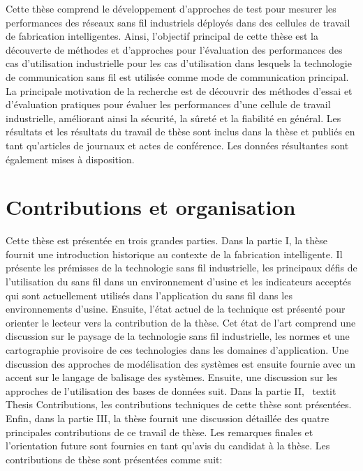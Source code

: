 \documentclass[12pt]{article}
\begin{document}
		Cette thèse comprend le développement d'approches de test pour mesurer les performances des réseaux sans fil industriels déployés dans des cellules de travail de fabrication intelligentes. Ainsi, l'objectif principal de cette thèse est la découverte de méthodes et d'approches pour l'évaluation des performances des cas d'utilisation industrielle pour les cas d'utilisation dans lesquels la technologie de communication sans fil est utilisée comme mode de communication principal. La principale motivation de la recherche est de découvrir des méthodes d'essai et d'évaluation pratiques pour évaluer les performances d'une cellule de travail industrielle, améliorant ainsi la sécurité, la sûreté et la fiabilité en général. Les résultats et les résultats du travail de thèse sont inclus dans la thèse et publiés en tant qu'articles de journaux et actes de conférence. Les données résultantes sont également mises à disposition.
		
		\section*{Contributions et organisation}
		
		Cette thèse est présentée en trois grandes parties. Dans la partie I, la thèse fournit une introduction historique au contexte de la fabrication intelligente. Il présente les prémisses de la technologie sans fil industrielle, les principaux défis de l'utilisation du sans fil dans un environnement d'usine et les indicateurs acceptés qui sont actuellement utilisés dans l'application du sans fil dans les environnements d'usine. Ensuite, l'état actuel de la technique est présenté pour orienter le lecteur vers la contribution de la thèse. Cet état de l'art comprend une discussion sur le paysage de la technologie sans fil industrielle, les normes et une cartographie provisoire de ces technologies dans les domaines d'application. Une discussion des approches de modélisation des systèmes est ensuite fournie avec un accent sur le langage de balisage des systèmes. Ensuite, une discussion sur les approches de l'utilisation des bases de données suit. Dans la partie II, \ textit {Thesis Contributions}, les contributions techniques de cette thèse sont présentées. Enfin, dans la partie III, la thèse fournit une discussion détaillée des quatre principales contributions de ce travail de thèse. Les remarques finales et l'orientation future sont fournies en tant qu'avis du candidat à la thèse. Les contributions de thèse sont présentées comme suit:\vspace{5mm}
		
\end{document}
